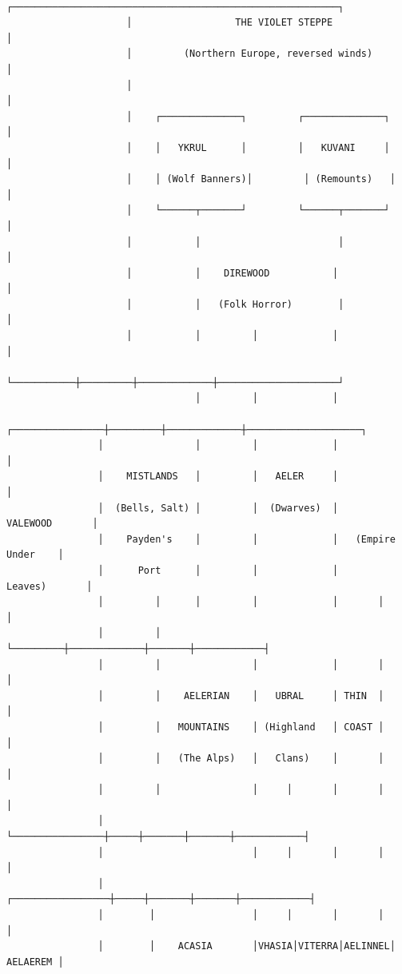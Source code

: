 \documentclass[12pt,oneside]{book}
\begin{document}
\begin{verbatim}
                     ┌─────────────────────────────────────────────────────────┐
                     │                  THE VIOLET STEPPE                     │
                     │         (Northern Europe, reversed winds)              │
                     │                                                         │
                     │    ┌──────────────┐         ┌──────────────┐           │
                     │    │   YKRUL      │         │   KUVANI     │           │
                     │    │ (Wolf Banners)│         │ (Remounts)   │           │
                     │    └──────┬───────┘         └──────┬───────┘           │
                     │           │                        │                     │
                     │           │    DIREWOOD           │                     │
                     │           │   (Folk Horror)        │                     │
                     │           │         │             │                     │
                     └───────────┼─────────┼─────────────┼─────────────────────┘
                                 │         │             │
                ┌────────────────┼─────────┼─────────────┼────────────────────┐
                │                │         │             │                    │
                │    MISTLANDS   │         │   AELER     │                    │
                │  (Bells, Salt) │         │  (Dwarves)  │     VALEWOOD       │
                │    Payden's    │         │             │   (Empire Under    │
                │      Port      │         │             │      Leaves)       │
                │         │      │         │             │       │            │
                │         │      └─────────┼─────────────┼───────┼────────────┤
                │         │                │             │       │            │
                │         │    AELERIAN    │   UBRAL     │ THIN  │            │
                │         │   MOUNTAINS    │ (Highland   │ COAST │            │
                │         │   (The Alps)   │   Clans)    │       │            │
                │         │                │     │       │       │            │
                │         └────────────────┼─────┼───────┼───────┼────────────┤
                │                          │     │       │       │            │
                │        ┌─────────────────┼─────┼───────┼───────┼────────────┤
                │        │                 │     │       │       │            │
                │        │    ACASIA       │VHASIA│VITERRA│AELINNEL│ AELAEREM │

\end{verbatim}
\end{document}
